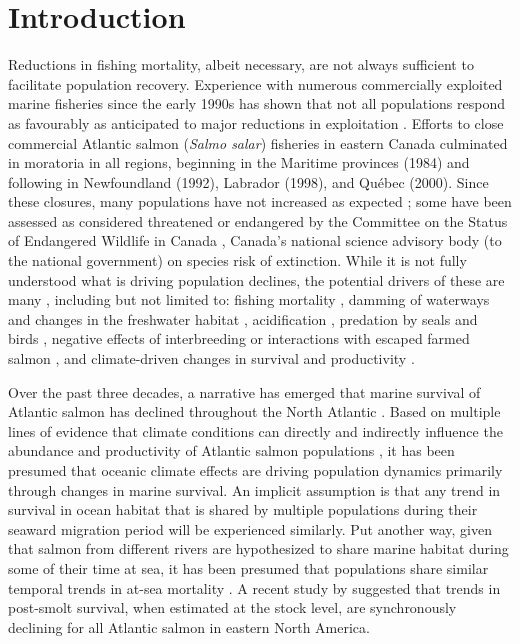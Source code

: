 \documentclass[12pt]{article}
\begin{document}

\section*{Introduction} %


Reductions in fishing mortality, albeit necessary, are not always sufficient
to facilitate population recovery. Experience with numerous commercially
exploited marine fisheries since the early 1990s has shown that not all
populations respond as favourably as anticipated to major reductions in
exploitation \citep{Hutchings2017}. Efforts to close commercial
Atlantic salmon (\emph{Salmo salar}) fisheries in eastern Canada culminated in
moratoria in all regions, beginning in the Maritime provinces (1984) and
following in Newfoundland (1992), Labrador (1998), and Qu\'{e}bec (2000). Since
these closures, many populations have not increased as 
expected \citep{Dempson2004, ICES2019}; some 
have been assessed as considered threatened or endangered by the 
Committee on the Status of Endangered Wildlife in Canada \citep[][]{Cosewic2010}, 
Canada's national science advisory body (to the national government) on
species risk of extinction.
While it is not fully understood what is driving population declines, the potential
drivers of these are many \citep[see ][for a detailed discussion of possible
causes]{Cairns2001}, including but not limited to: fishing mortality \citep{Dempson2004}, 
damming of waterways and changes in the freshwater habitat \citep{Dunfield1985}, acidification
\citep[particularly in the Southern Uplands region of
NS, see][]{Gibson2010}, predation by seals and birds \citep{Cairns2000}, negative
effects of interbreeding or interactions with escaped farmed salmon
\citep{Keyser2018}, and climate-driven changes in survival and productivity \citep{Mills2013}.

Over the past three decades, a narrative has emerged that marine survival of
Atlantic salmon has declined throughout the North Atlantic \citep{ICES2019}.
Based on multiple lines of evidence that climate conditions can directly and
indirectly influence the abundance and productivity of Atlantic salmon
populations \citep{Mills2013,Almodovar2019}, it has been presumed that oceanic climate effects are
driving population dynamics primarily through changes in marine survival.
An implicit assumption is that any trend in
survival in ocean habitat that is shared by multiple populations during their
seaward migration period will be experienced similarly. 
Put another way, given that salmon from different rivers 
are hypothesized to share marine habitat during some of their time at sea, it
has been presumed that populations share similar temporal trends in
at-sea mortality \citep{Friedland1993, Friedland1998, Russell2012}.  
A recent study by \citet{Olmos2019} suggested that trends in post-smolt
survival, when estimated at the stock level, are synchronously declining
for all Atlantic salmon in eastern North America.
\end{document}
